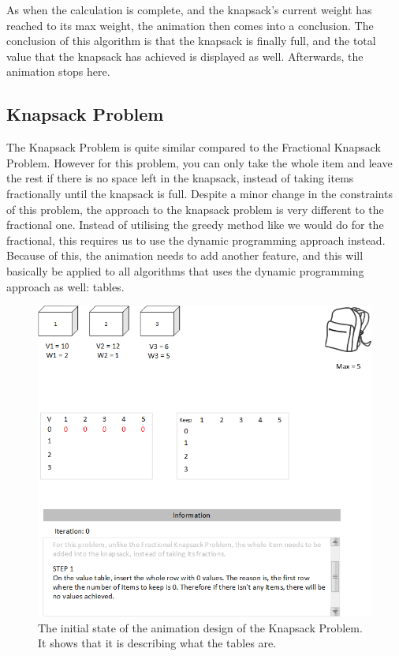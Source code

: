 As when the calculation is complete, and the knapsack's current weight has reached to its max weight, the animation then comes into a conclusion. The conclusion of this algorithm is that the knapsack is finally full, and the total value that the knapsack has achieved is displayed as well. Afterwards, the animation stops here. 

\newpage

\subsection{Knapsack Problem}

The Knapsack Problem is quite similar compared to the Fractional Knapsack Problem. However for this problem, you can only take the whole item and leave the rest if there is no space left in the knapsack, instead of taking items fractionally until the knapsack is full. Despite a minor change in the constraints of this problem, the approach to the knapsack problem is very different to the fractional one. Instead of utilising the greedy method like we would do for the fractional, this requires us to use the dynamic programming approach instead. Because of this, the animation needs to add another feature, and this will basically be applied to all algorithms that uses the dynamic programming approach as well: tables.

\begin{figure}[H]
\centering
\includegraphics[scale=0.7]{images/report_images/animationDesignKnapsackProblem_STEP2.png}
\caption{The initial state of the animation design of the Knapsack Problem. It shows that it is describing what the tables are.}
\label{animationDesignKnapsackProblem}
\end{figure}


